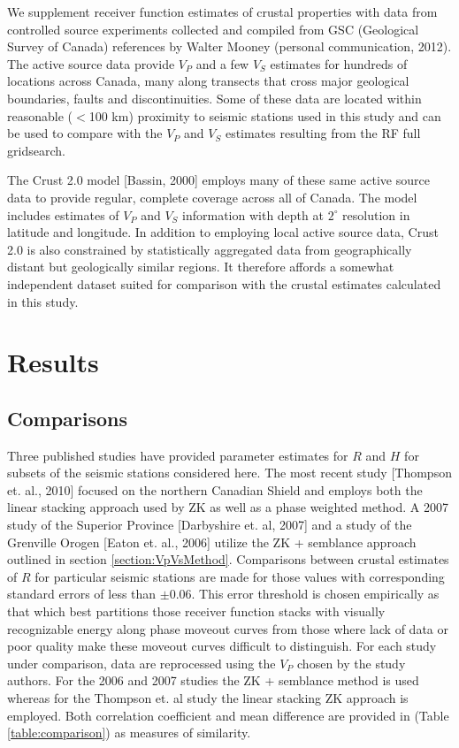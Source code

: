 \documentclass[draft, 12pt]{article}
\begin{document}
We supplement receiver function estimates of crustal properties with data from controlled source experiments collected and compiled from GSC (Geological Survey of Canada) references by Walter Mooney (personal communication, 2012). The active source data provide $V_P$ and a few $V_S$ estimates for hundreds of locations across Canada, many along transects that cross major geological boundaries, faults and discontinuities. Some of these data are located within reasonable ($<$100 km) proximity to seismic stations used in this study and can be used to compare with the $V_P$ and $V_S$ estimates resulting from the RF full gridsearch.

The Crust 2.0 model [Bassin, 2000] employs many of these same active source data to provide regular, complete coverage across all of Canada. The model includes estimates of $V_P$ and $V_S$ information with depth at
$2^\circ$ resolution in latitude and longitude. In addition to employing local active source data, Crust 2.0 is also constrained by statistically aggregated data from geographically distant but geologically similar regions. It therefore affords a somewhat independent dataset suited for comparison with the crustal estimates calculated in this study.

\section{Results}

\subsection{Comparisons}

Three published studies have provided parameter estimates for $R$ and $H$ for subsets of the seismic stations considered here. The most recent study [Thompson et. al., 2010] focused on the northern Canadian Shield and employs both the linear stacking approach used by ZK as well as a phase weighted method. A 2007 study of the Superior Province [Darbyshire et. al, 2007] and a study of the Grenville Orogen [Eaton et. al., 2006] utilize the ZK + semblance approach outlined in section \ref{section:VpVsMethod}.  Comparisons between crustal estimates of $R$ for particular seismic stations are made for those values with corresponding standard errors of less than $\pm$0.06. This error threshold is chosen empirically as that which best partitions those receiver function stacks with visually recognizable energy along phase moveout curves from those where lack of data or poor quality make these moveout curves difficult to distinguish. For each study under comparison, data are reprocessed using the $V_P$ chosen by the study authors. For the 2006 and 2007 studies the ZK + semblance method is used whereas for the Thompson et. al study the linear stacking ZK approach is employed. Both correlation coefficient and mean difference are provided in (Table \ref{table:comparison}) as measures of similarity.
\end{document}
